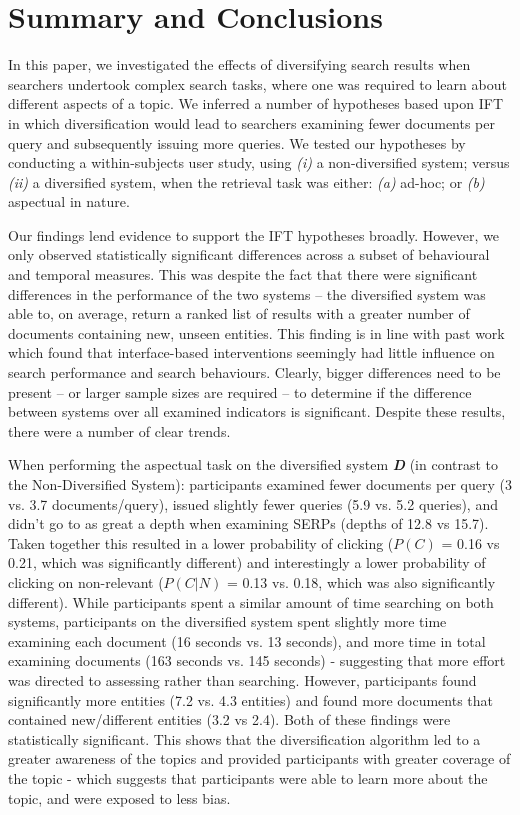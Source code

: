 \section{Summary and Conclusions} \label{sec:conclusion}

In this paper, we investigated the effects of diversifying search results when searchers undertook complex search tasks, where one was required to learn about different aspects of a topic. We inferred a number of hypotheses based upon IFT in which diversification would lead to searchers examining fewer documents per query and subsequently issuing more queries. We tested our hypotheses by conducting a within-subjects user study, using \emph{(i)} a non-diversified system; versus \emph{(ii)} a diversified system, when the retrieval task was either: \emph{(a)} ad-hoc; or \emph{(b)} aspectual in nature.

Our findings lend evidence to support the IFT hypotheses broadly. However, we only observed statistically significant differences across a subset of behavioural and temporal measures. This was despite the fact that there were significant differences in the performance of the two systems -- the diversified system was able to, on average, return a ranked list of results with a greater number of documents containing new, unseen entities. This finding is in line with past work which found that interface-based interventions seemingly had little influence on search performance and search behaviours. Clearly, bigger differences need to be present -- or larger sample sizes are required -- to determine if the difference between systems over all examined indicators is significant. Despite these results, there were a number of clear trends.

When performing the aspectual task on the diversified system \textbf{\emph{D}} (in contrast to the Non-Diversified System):  participants examined fewer documents per query (3 vs. 3.7 documents/query), issued slightly fewer queries (5.9 vs. 5.2 queries), and didn't go to as great a depth when examining SERPs (depths of 12.8 vs 15.7). Taken together this resulted in a lower probability of clicking ($P(C)$ = 0.16 vs 0.21, which was significantly different) and interestingly a lower probability of clicking on non-relevant ($P(C|N)$ = 0.13 vs. 0.18, which was also significantly different). While participants spent a similar amount of time searching on both systems, participants on the diversified system spent slightly more time examining each document (16 seconds vs. 13 seconds), and more time in total examining documents (163 seconds vs. 145 seconds) - suggesting that more effort was directed to assessing rather than searching. However, participants found significantly more entities (7.2 vs. 4.3 entities) and found more documents that contained new/different entities (3.2 vs 2.4). Both of these findings were statistically significant. This shows that the diversification algorithm led to a greater awareness of the topics and provided participants with greater coverage of the topic - which suggests that participants were able to learn more about the topic, and were exposed to less bias.

